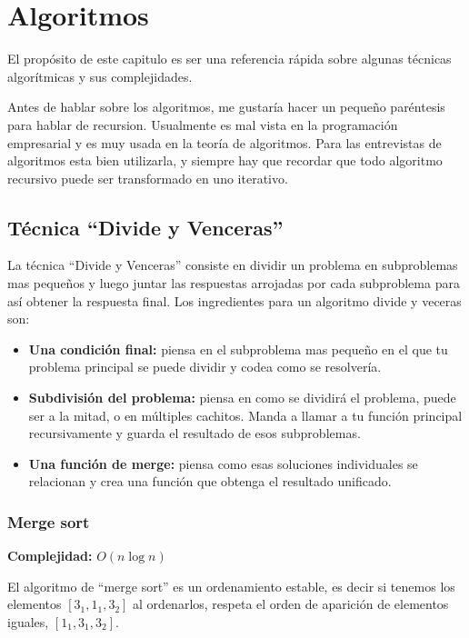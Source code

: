 \chapter{Algoritmos}

El propósito de este capitulo es ser una referencia rápida sobre algunas técnicas algorítmicas y sus complejidades.

Antes de hablar sobre los algoritmos, me gustaría hacer un pequeño paréntesis para hablar de recursion. Usualmente es mal vista en la programación empresarial y es muy usada en la teoría de algoritmos. Para las entrevistas de algoritmos esta bien utilizarla, y siempre hay que recordar que todo algoritmo recursivo puede ser transformado en uno iterativo.

\section{Técnica ``Divide y Venceras''}

La técnica ``Divide y Venceras'' consiste en dividir un problema en subproblemas mas pequeños y luego juntar las respuestas arrojadas por cada subproblema para así obtener la respuesta final. Los ingredientes para un algoritmo divide y veceras son:

\begin{itemize}
    \item \textbf{Una condición final:} piensa en el subproblema mas pequeño en el que tu problema principal se puede dividir y codea como se resolvería.
    \item \textbf{Subdivisión del problema:} piensa en como se dividirá el problema, puede ser a la mitad, o en múltiples cachitos. Manda a llamar a tu función principal recursivamente y guarda el resultado de esos subproblemas.
    \item \textbf{Una función de merge:} piensa como esas soluciones individuales se relacionan y crea una función que obtenga el resultado unificado.
\end{itemize}

\subsection{Merge sort}

\textbf{Complejidad:} $O(n \log n)$

El algoritmo de ``merge sort'' es un ordenamiento estable, es decir si tenemos los elementos $[3_1, 1_1,3_2]$ al ordenarlos, respeta el orden de aparición de elementos iguales, $[1_1,3_1,3_2]$.

